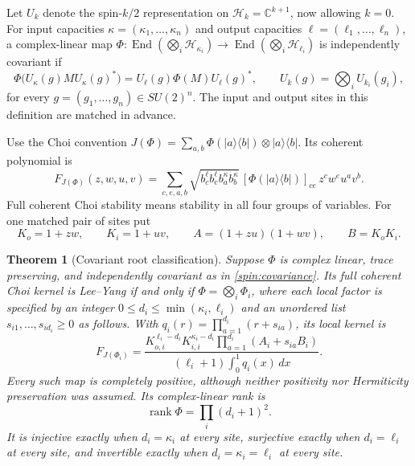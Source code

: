 \documentclass[reqno]{amsart}
\newtheorem{theorem}{Theorem}[section]
\theoremstyle{definition}
\theoremstyle{remark}
\newcommand{\C}{\mathbb C}
\DeclareMathOperator{\rank}{rank}
\begin{document}
Let $U_k$ denote the spin-$k/2$ representation on
$\mathcal H_k=\C^{k+1}$, now allowing $k=0$.
For input capacities $\kappa=(\kappa_1,\ldots,\kappa_n)$ and output
capacities $\ell=(\ell_1,\ldots,\ell_n)$, a complex-linear map
$\Phi:\operatorname{End}(\bigotimes_i\mathcal H_{\kappa_i})
\to\operatorname{End}(\bigotimes_i\mathcal H_{\ell_i})$
is independently covariant if
\begin{equation}\label{spin:covariance}
 \Phi\bigl(U_\kappa(g)MU_\kappa(g)^*\bigr)
 =U_\ell(g)\Phi(M)U_\ell(g)^*,\qquad
 U_k(g)=\bigotimes_iU_{k_i}(g_i),
\end{equation}
for every $g=(g_1,\ldots,g_n)\in SU(2)^n$.
The input and output sites in this definition are matched in advance.

Use the Choi convention
$J(\Phi)=\sum_{a,b}\Phi(|a\rangle\langle b|)\otimes
|a\rangle\langle b|$.  Its coherent polynomial is
\begin{equation}\label{spin:choi-weights}
 F_{J(\Phi)}(z,w,u,v)=
 \sum_{c,e,a,b}\sqrt{b^{\ell}_cb^{\ell}_e
                          b^{\kappa}_ab^{\kappa}_b}\,
 [\Phi(|a\rangle\langle b|)]_{ce}\,z^cw^eu^av^b.
\end{equation}
Full coherent Choi stability means stability in all four groups of
variables.  For one matched pair of sites put
\begin{equation}\label{spin:invariants}
 K_o=1+zw,\qquad K_i=1+uv,\qquad
 A=(1+zu)(1+wv),\qquad B=K_oK_i.
\end{equation}

\begin{theorem}[Covariant root classification]\label{spin:covariant}
Suppose $\Phi$ is complex linear, trace preserving, and independently
covariant as in \eqref{spin:covariance}.  Its full coherent Choi kernel is
Lee--Yang if and only if $\Phi=\bigotimes_i\Phi_i$, where each local
factor is specified by an integer $0\leq d_i\leq\min(\kappa_i,\ell_i)$
and an unordered list $s_{i1},\ldots,s_{id_i}\geq0$ as follows.  With
$q_i(r)=\prod_{a=1}^{d_i}(r+s_{ia})$, its local kernel is
\begin{equation}\label{spin:covariant-kernel}
 F_{J(\Phi_i)}=
 \frac{K_{o,i}^{\ell_i-d_i}K_{i,i}^{\kappa_i-d_i}
            \prod_{a=1}^{d_i}(A_i+s_{ia}B_i)}
      {(\ell_i+1)\int_0^1q_i(x)\,dx}.
\end{equation}
Every such map is completely positive, although neither positivity nor
Hermiticity preservation was assumed.  Its complex-linear rank is
\begin{equation}\label{spin:covariant-rank}
 \rank\Phi=\prod_i(d_i+1)^2.
\end{equation}
It is injective exactly when $d_i=\kappa_i$ at every site, surjective
exactly when $d_i=\ell_i$ at every site, and invertible exactly when
$d_i=\kappa_i=\ell_i$ at every site.
\end{theorem}
\end{document}
